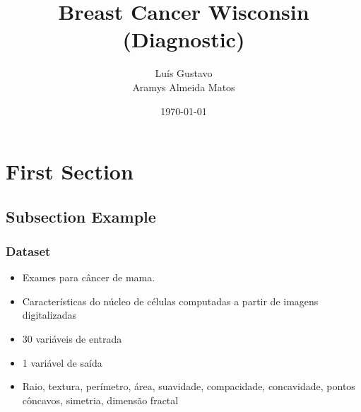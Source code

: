 \documentclass{beamer}
\title[Short title]{Breast Cancer Wisconsin (Diagnostic)} %
\author{Luís Gustavo \\
Aramys Almeida Matos
} %
\institute[UFRJ] %
{
Inteligência Computacional \\ %
\medskip
}
\date{\today} %
\begin{document}
\begin{frame}
\titlepage %
\end{frame}



\section{First Section} %

\subsection{Subsection Example} %

\begin{frame}
\frametitle{Dataset}
\begin{itemize}
\item Exames para câncer de mama.
\item Características do núcleo de células computadas a partir de imagens digitalizadas
\item 30 variáveis de entrada
\item 1 variável de saída
\item Raio, textura, perímetro, área, suavidade, compacidade, concavidade, pontos côncavos, simetria, dimensão fractal
\end{itemize}
\end{frame}
\end{document}
